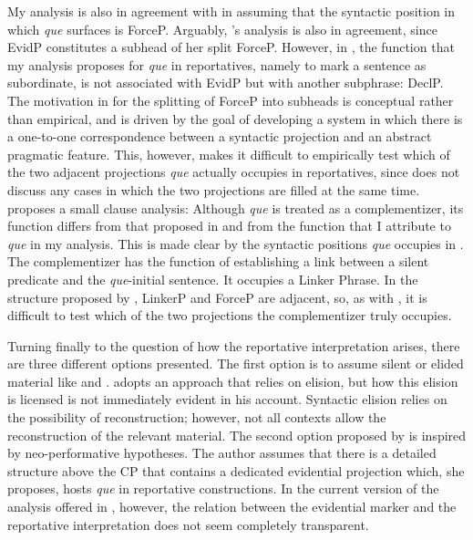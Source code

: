 My analysis is also in  agreement with \citet{DemonteSoriano2014} in assuming that the syntactic position in which \emph{que} surfaces is ForceP. Arguably, \citeauthor{Corr2016}'s analysis is also in agreement, since  EvidP constitutes a subhead of her split ForceP. However, in \citet{Corr2016}, the function that my analysis proposes for \emph{que} in reportatives, namely to mark a sentence as subordinate, is not associated with EvidP but with  another  subphrase: DeclP. The motivation in \citet{Corr2016} for the splitting of ForceP into subheads is  conceptual rather than empirical, and  is driven by the goal of developing a system in which there is  a one-to-one correspondence between a syntactic projection and an abstract pragmatic feature. This, however, makes it difficult  to empirically test which of the two adjacent projections \emph{que} actually occupies in reportatives, since  \citet{Corr2016} does not discuss any cases in which the two projections are filled at the same time. 
\citet{Etxepare2013} proposes a small clause analysis: Although \emph{que} is treated as a  complementizer, its function differs from that proposed in \citet{DemonteSoriano2014} and from the function that I attribute to \emph{que} in my analysis. This is made clear by the syntactic positions \emph{que} occupies in \citet{Etxepare2013}. The complementizer has the function  of establishing a link between a silent predicate and the \emph{que}-initial sentence. It occupies a  Linker Phrase. In the structure proposed by \citet{Etxepare2013},  LinkerP and ForceP are adjacent, so, as with \citet{Corr2016}, it is difficult to test which of the two projections the complementizer truly occupies. 


Turning finally to the question of   how the reportative interpretation arises, there are three different options presented. The first option is to assume silent or elided material like \citet{Etxepare2013} and \citet{DemonteSoriano2014}.  \citet{Etxepare2013} adopts an approach that relies on elision, but how this elision is licensed  is not immediately  evident in his account. Syntactic elision relies on the possibility of reconstruction; however, not all contexts allow the reconstruction of the relevant material.  The second option proposed by  \citet{Corr2016} is inspired by neo-performative hypotheses. The author assumes that there is a  detailed  structure above the CP that  contains a dedicated evidential projection  which, she proposes, hosts \emph{que} in reportative constructions. In the current version of the analysis offered in \citet{Corr2016}, however, the relation  between the evidential marker and the reportative interpretation does not seem completely transparent.

